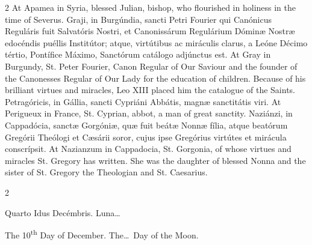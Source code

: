 \begin{paracol}{2}
At Apamea in Syria, blessed Julian, 
 bishop, who flourished in holiness in the time of Severus.
\switchcolumn*
{}
Graji, in Burgúndia, 
 sancti Petri Fourier qui Canónicus Reguláris fuit Salvatóris Nostri, et 
 Canonissárum Regulárium Dóminæ Nostræ edocéndis puéllis Institútor; atque, 
 virtútibus ac miráculis clarus, a Leóne Décimo tértio, Pontífice Máximo, 
 Sanctórum catálogo adjúnctus est.
\switchcolumn
{}
At Gray in Burgundy, St. Peter 
 Fourier, Canon Regular of Our Saviour and the founder of the Canonesses 
 Regular of Our Lady for the education of children. Because of his 
 brilliant virtues and miracles, Leo XIII placed him the catalogue of the 
 Saints.
\switchcolumn*
{}
Petragóricis, in 
 Gállia, sancti Cypriáni Abbátis, magnæ sanctitátis viri.
\switchcolumn
{}
At Perigueux in France, St. Cyprian, 
 abbot, a man of great sanctity.
\switchcolumn*
{}
Naziánzi, in Cappadócia, 
 sanctæ Gorgóniæ, quæ fuit beátæ Nonnæ fília, atque beatórum Gregórii 
 Theólogi et Cæsárii soror, cujus ipse Gregórius virtútes et mirácula 
 conscrípsit.
\switchcolumn
{}
At Nazianzum in Cappadocia, St. 
 Gorgonia, of whose virtues and miracles St. Gregory has written. She 
 was the daughter of blessed Nonna and the sister of St. Gregory the 
 Theologian and St. Caesarius.
\switchcolumn*
{}
\end{paracol}


\begin{paracol}{2}
\begin{center}{\color{gregoriocolor} Quarto Idus Decémbris. 
 Luna\dots\ }\end{center}
\switchcolumn
{}
\begin{center}{\color{gregoriocolor} The 
 10\textsuperscript{th} Day of 
 December. The\dots\ Day of the Moon.}\end{center}
\end{paracol}


